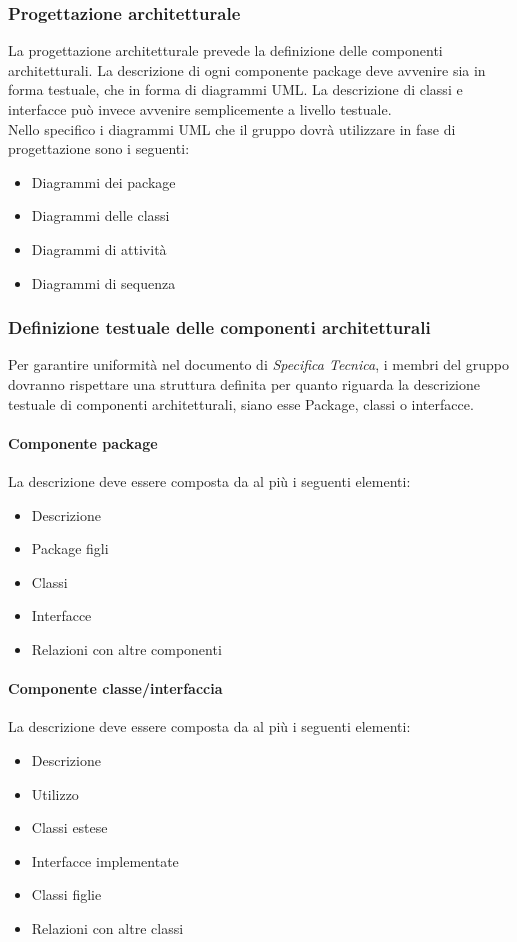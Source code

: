 \documentclass[a4paper]{article}
\begin{document}
		
		\subsubsection{Progettazione architetturale}
		La progettazione architetturale prevede la definizione delle componenti architetturali. La descrizione di ogni  componente package deve avvenire sia in forma testuale, che in forma di diagrammi UML. La descrizione di classi e interfacce può invece avvenire semplicemente a livello testuale.  \\
		Nello specifico i diagrammi UML che il gruppo dovrà utilizzare in fase di progettazione sono i seguenti:
		\begin{itemize}
			\item Diagrammi dei package
			\item Diagrammi delle classi
			\item Diagrammi di attività
			\item Diagrammi di sequenza
		\end{itemize}
		
		\subsubsection{Definizione testuale delle componenti architetturali}
		Per garantire uniformità nel documento di \emph{Specifica Tecnica}, i membri del gruppo dovranno rispettare una struttura definita per quanto riguarda la descrizione testuale di componenti architetturali, siano esse Package,  classi o interfacce. 
		\paragraph{Componente package} 
		La descrizione deve essere composta da al più i seguenti elementi:
		\begin{itemize}
			\item Descrizione
			\item Package figli
			\item Classi
			\item Interfacce
			\item Relazioni con altre componenti
		\end{itemize}
		
		\paragraph{Componente classe/interfaccia} 
		La descrizione deve essere composta da al più i seguenti elementi:
		\begin{itemize}
			\item Descrizione
			\item Utilizzo
			\item Classi estese
			\item Interfacce implementate
			\item Classi figlie
			\item Relazioni con altre classi
		\end{itemize}
		
\end{document}
